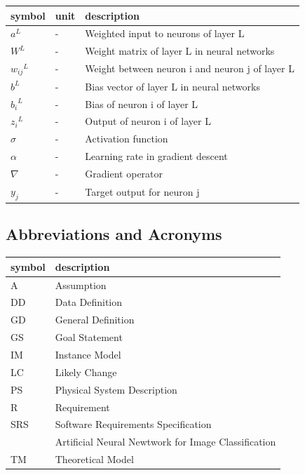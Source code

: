 \documentclass[12pt]{article}
\begin{document}
\renewcommand{\arraystretch}{1.2}
\noindent \begin{longtable*}{l l p{12cm}} \toprule
\textbf{symbol} & \textbf{unit} & \textbf{description}\\
\midrule 
$a^L$ & \si[per-mode=symbol] {-} & Weighted input to neurons of layer L
\\ 
$W^L$ & \si[per-mode=symbol] {-} & Weight matrix of layer L in neural networks
\\ 
${w_{ij}}^L$ & \si[per-mode=symbol] {-} & Weight between neuron i and neuron j of layer L
\\
$b^L$ & \si[per-mode=symbol] {-} & Bias vector of layer L in neural networks
\\ 
${b_{i}}^L$ & \si[per-mode=symbol] {-} & Bias of neuron i of layer L
\\
${z_{i}}^L$ & \si[per-mode=symbol] {-} & Output of neuron i of layer L
\\
$\sigma$ & \si[per-mode=symbol] {-} & Activation function
\\ 
$\alpha$ & \si[per-mode=symbol] {-} & Learning rate in gradient descent
\\
$\nabla$ & \si[per-mode=symbol] {-} & Gradient operator
\\
$y_j$ & \si[per-mode=symbol] {-} & Target output for neuron j 
\\ 
\bottomrule
\end{longtable*}

\subsection{Abbreviations and Acronyms}

\renewcommand{\arraystretch}{1.2}
\begin{tabular}{l l} 
  \toprule		
  \textbf{symbol} & \textbf{description}\\
  \midrule 
  A & Assumption\\
  DD & Data Definition\\
  GD & General Definition\\
  GS & Goal Statement\\
  IM & Instance Model\\
  LC & Likely Change\\
  PS & Physical System Description\\
  R & Requirement\\
  SRS & Software Requirements Specification\\
  \progname{} & Artificial Neural Newtwork for Image Classification\\
  TM & Theoretical Model\\
  \bottomrule
\end{tabular}\\
\end{document}
